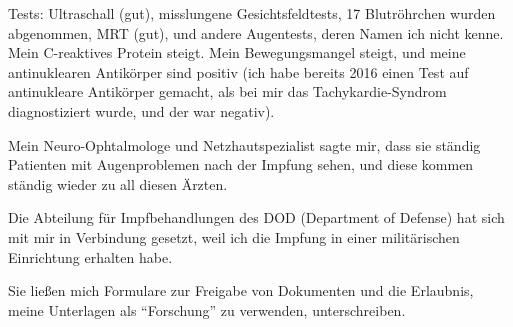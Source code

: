 Tests: Ultraschall (gut), misslungene Gesichtsfeldtests, 17 Blutröhrchen wurden
abgenommen, MRT (gut), und andere Augentests, deren Namen ich nicht kenne. Mein
C-reaktives Protein steigt. Mein Bewegungsmangel steigt, und meine antinuklearen
Antikörper sind positiv (ich habe bereits 2016 einen Test auf antinukleare
Antikörper gemacht, als bei mir das Tachykardie-Syndrom diagnostiziert wurde,
und der war negativ).

Mein Neuro-Ophtalmologe und Netzhautspezialist sagte mir, dass sie ständig
Patienten mit Augenproblemen nach der Impfung sehen, und diese kommen ständig
wieder zu all diesen Ärzten.

Die Abteilung für Impfbehandlungen des DOD (Department of Defense) hat sich mit
mir in Verbindung gesetzt, weil ich die Impfung in einer militärischen
Einrichtung erhalten habe.

Sie ließen mich Formulare zur Freigabe von Dokumenten und die Erlaubnis, meine
Unterlagen als “Forschung” zu verwenden, unterschreiben.

